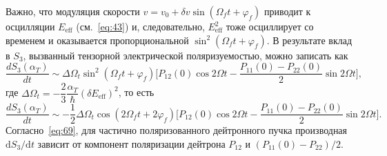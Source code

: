 \documentclass[11pt,a4paper]{article}
\begin{document}
Важно, что модуляция скорости $v=v_0+\delta v\sin(\Omega_f t+\varphi_f)$
приводит к осцилляции $E_{\mathrm{eff}}$ (см.~\eqref{eq:43}) и, следовательно,
$E_{\mathrm{eff}}^2$ тоже осциллирует со временем и оказывается
пропорциональной $\sin^2(\Omega_f t+\varphi_f)$. В результате вклад в $S_3$,
вызванный тензорной электрической поляризуемостью, можно записать как
\begin{equation}
\frac{dS_3(\alpha_T)}{dt}
\sim\Delta\Omega_t\sin^2(\Omega_f t+\varphi_f)
\Biggl[
P_{12}(0)\cos 2\Omega t
-\frac{P_{11}(0)-P_{22}(0)}{2}\sin 2\Omega t
\Biggr],
\label{eq:68}
\end{equation}
где $\Delta\Omega_t=-\dfrac23\dfrac{\alpha_T}{\hbar}(\delta E_{\mathrm{eff}})^2$,
то есть
\begin{equation}
\frac{dS_3(\alpha_T)}{dt}
\sim -\frac12\Delta\Omega_t\cos(2\Omega_f t+2\varphi_f)
\Biggl[
P_{12}(0)\cos 2\Omega t
-\frac{P_{11}(0)-P_{22}(0)}{2}\sin 2\Omega t
\Biggr].
\label{eq:69}
\end{equation}
Согласно~\eqref{eq:69}, для частично поляризованного дейтронного пучка
производная $\mathrm{d}S_3/\mathrm{d}t$ зависит от компонент поляризации
дейтрона $P_{12}$ и $(P_{11}(0)-P_{22})/2$.
\end{document}
